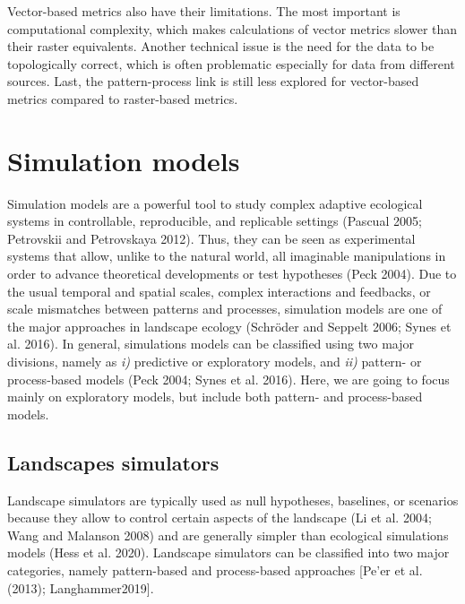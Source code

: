 \documentclass[
  10pt,
  a4paperpaper,
]{article}
\begin{document}
Vector-based metrics also have their limitations. The most important is
computational complexity, which makes calculations of vector metrics
slower than their raster equivalents. Another technical issue is the
need for the data to be topologically correct, which is often
problematic especially for data from different sources. Last, the
pattern-process link is still less explored for vector-based metrics
compared to raster-based metrics.

\section{Simulation models}\label{simulation-models}

Simulation models are a powerful tool to study complex adaptive
ecological systems in controllable, reproducible, and replicable
settings (Pascual 2005; Petrovskii and Petrovskaya 2012). Thus, they can
be seen as experimental systems that allow, unlike to the natural world,
all imaginable manipulations in order to advance theoretical
developments or test hypotheses (Peck 2004). Due to the usual temporal
and spatial scales, complex interactions and feedbacks, or scale
mismatches between patterns and processes, simulation models are one of
the major approaches in landscape ecology (Schröder and Seppelt 2006;
Synes et al. 2016). In general, simulations models can be classified
using two major divisions, namely as \emph{i)} predictive or exploratory
models, and \emph{ii)} pattern- or process-based models (Peck 2004;
Synes et al. 2016). Here, we are going to focus mainly on exploratory
models, but include both pattern- and process-based models.

\subsection{Landscapes simulators}\label{landscapes-simulators}

Landscape simulators are typically used as null hypotheses, baselines,
or scenarios because they allow to control certain aspects of the
landscape (Li et al. 2004; Wang and Malanson 2008) and are generally
simpler than ecological simulations models (Hess et al. 2020). Landscape
simulators can be classified into two major categories, namely
pattern-based and process-based approaches {[}Pe'er et al. (2013);
Langhammer2019{]}.
\end{document}
